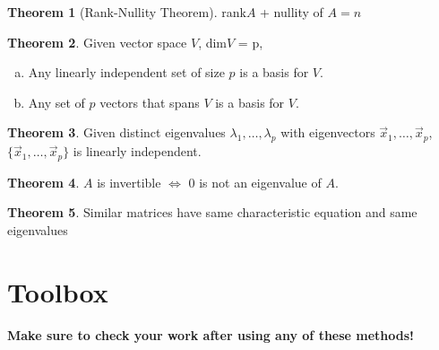 \documentclass[a4paper,12pt]{article}
\theoremstyle{definition}
\newtheorem{theorem}{Theorem}
\theoremstyle{definition}
\newcommand{\finitevecs}[2]{#1_1,\ldots,#1_#2}
\newcommand{\finitevecsset}[2]{\{\finitevecs{#1}{#2}\}}
\begin{document}
	\begin{theorem}[Rank-Nullity Theorem]
		\label{thm:rank-nul-thm}
		rank$A$ + nullity of $A = n$
	\end{theorem}
	
	\begin{theorem}
		\label{thm:vec-spc-dim-thm}
		Given vector space $V$, dim$V$ = p,
		\begin{enumerate}[a.]
			\item Any linearly independent set of size $p$ is a basis for $V$.
			
			\item Any set of $p$ vectors that spans $V$ is a basis for $V$.
		\end{enumerate}
	\end{theorem}
	
	\begin{theorem}
		\label{thm:eigen-vec-lin-indep-thm}
		Given distinct eigenvalues $\finitevecs{\lambda}{p}$ with eigenvectors $\finitevecs{\vec{x}}{p}$, $\finitevecsset{\vec{x}}{p}$ is linearly independent.
	\end{theorem}
	
	\begin{theorem}
		\label{thm:zero-eigenval-invertibility-thm}
		$A$ is invertible $\Leftrightarrow$ 0 is not an eigenvalue of $A$.
	\end{theorem}
	
	\begin{theorem}
		\label{similar-mat-char-eq-thm}
		Similar matrices have same characteristic equation and same eigenvalues
	\end{theorem}
	\newpage
	
	\section{Toolbox}
	\textbf{Make sure to check your work after using any of these methods!}
	
\end{document}
